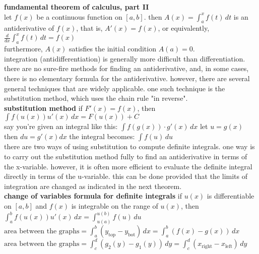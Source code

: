 \documentclass{article}
\begin{document}
\textbf{fundamental theorem of calculus, part II}\\
let $f(x)$ be a continuous function on $[a, b]$. then $A(x) = \int_{a}^{x}f(t)\, dt$ is an antiderivative of $f(x)$, that is, $A'(x) = f(x)$, or equivalently,\\
$\frac{d}{dx}\int_{a}^{x}f(t)\,dt = f(x)$\\
furthermore, $A(x)$ satisfies the initial condition $A(a) = 0$.\\

integration (antidifferentiation) is generally more difficult than differentiation. there are no sure-fire methods for finding an antiderivative, and, in some cases, there is no elementary formula for the antiderivative. however, there are several general techniques that are widely applicable. one such technique is the substitution method, which uses the chain rule "in reverse".\\

\textbf{substitution method} if $F'(x) = f(x)$, then\\
$\int f(u(x))u'(x)\,dx = F(u(x)) + C$\\

say you're given an integral like this: $\int f(g(x)) \cdot g'(x)\,dx$ let $u = g(x)$ then $du = g'(x)dx$ the integral becomes: $\int f(u)\,du$\\

there are two ways of using substitution to compute definite integrals. one way is to carry out the substitution method fully to find an antiderivative in terms of the x-variable. however, it is often more efficient to evaluate the definite integral directly in terms of the u-variable. this can be done provided that the limits of integration are changed as indicated in the next theorem.\\

\textbf{change of variables formula for definite integrals} if $u(x)$ is differentiable on $[a, b]$ and $f(x)$ is integrable on the range of $u(x)$, then\\
$\int_{a}^{b}f(u(x))u'(x)\,dx = \int_{u(a)}^{u(b)}f(u)\,du$\\

$\text{area between the graphs} = \int_{a}^{b}(y_{\text{top}} - y_{\text{bot}})\,dx = \int_{a}^{b}(f(x) - g(x))\,dx$\\

$\text{area between the graphs} = \int_{c}^{d}(g_2(y) - g_1(y))\,dy = \int_{c}^{d}(x_{\text{right}} - x_{\text{left}})\,dy$\\
\end{document}
